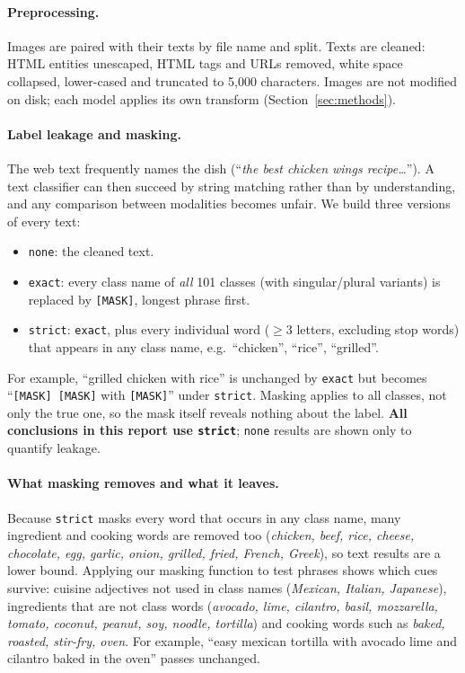 \documentclass[11pt,a4paper]{article}
\begin{document}
\paragraph{Preprocessing.}
Images are paired with their texts by file name and split. Texts are cleaned: HTML entities unescaped, HTML tags
and URLs removed, white space collapsed, lower-cased and truncated to 5,000 characters. Images are not modified on
disk; each model applies its own transform (Section~\ref{sec:methods}).

\paragraph{Label leakage and masking.}
The web text frequently names the dish (``\emph{the best chicken wings recipe\ldots}''). A text classifier can
then succeed by string matching rather than by understanding, and any comparison between modalities becomes
unfair. We build three versions of every text:
\begin{itemize}
  \item \texttt{none}: the cleaned text.
  \item \texttt{exact}: every class name of \emph{all} 101 classes (with singular/plural variants) is replaced
        by \texttt{[MASK]}, longest phrase first.
  \item \texttt{strict}: \texttt{exact}, plus every individual word ($\geq$3 letters, excluding stop words) that
        appears in any class name, e.g.\ ``chicken'', ``rice'', ``grilled''.
\end{itemize}
For example, ``grilled chicken with rice'' is unchanged by \texttt{exact} but becomes
``\texttt{[MASK] [MASK]} with \texttt{[MASK]}'' under \texttt{strict}. Masking applies to all classes, not
only the true one, so the mask itself reveals nothing about the label. \textbf{All conclusions in this
report use \texttt{strict}}; \texttt{none} results are shown only to quantify leakage.

\paragraph{What masking removes and what it leaves.}
Because \texttt{strict} masks every word that occurs in any class name, many ingredient and cooking words are
removed too (\emph{chicken, beef, rice, cheese, chocolate, egg, garlic, onion, grilled, fried, French, Greek}), so
text results are a lower bound. Applying our masking function to test phrases shows which cues survive: cuisine
adjectives not used in class names (\emph{Mexican, Italian, Japanese}), ingredients that are not class words
(\emph{avocado, lime, cilantro, basil, mozzarella, tomato, coconut, peanut, soy, noodle, tortilla}) and cooking
words such as \emph{baked, roasted, stir-fry, oven}. For example, ``easy mexican tortilla with avocado lime and
cilantro baked in the oven'' passes unchanged.
\end{document}
